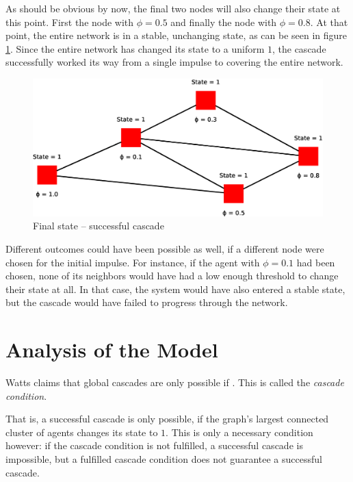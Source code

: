 \documentclass{sig-alternate-05-2015}
\begin{document}
As should be obvious by now, the final two nodes will also change their state at this point. First the node with $\phi = 0.5$ and finally the node with $\phi = 0.8$. At that point, the entire network is in a stable, unchanging state, as can be seen in figure \ref{fig:model5}. Since the entire network has changed its state to a uniform $1$, the cascade successfully worked its way from a single impulse to covering the entire network.

\begin{figure}[h!]
    \includegraphics[width=\columnwidth]{../presentation/img/model9}
    \centering
    \caption{Final state -- successful cascade}
    \label{fig:model5}
\end{figure}

Different outcomes could have been possible as well, if a different node were chosen for the initial impulse. For instance, if the agent with $\phi = 0.1$ had been chosen, none of its neighbors would have had a low enough threshold to change their state at all. In that case, the system would have also entered a stable state, but the cascade would have failed to progress through the network.


\section{Analysis of the Model}\label{sec:analysis}

Watts claims that global cascades are only possible if . This is called the \emph{cascade condition}.

That is, a successful cascade is only possible, if the graph's largest connected cluster of agents changes its state to $1$. This is only a necessary condition however: if the cascade condition is not fulfilled, a successful cascade is impossible, but a fulfilled cascade condition does not guarantee a successful cascade.
\end{document}
